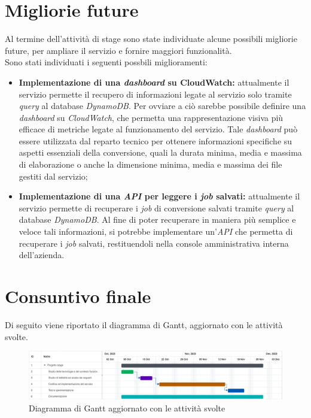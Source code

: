 \section{Migliorie future}
Al termine dell'attività di stage sono state individuate alcune possibili
migliorie future, per ampliare il servizio e fornire maggiori funzionalità. \\
Sono stati individuati i seguenti possbili miglioramenti:
\begin{itemize}
    \item \textbf{Implementazione di una \emph{dashboard} su CloudWatch:}
          attualmente il servizio permette il recupero di informazioni legate al
          servizio solo tramite \emph{query} al database \emph{DynamoDB}. Per ovviare
          a ciò sarebbe possibile definire una \emph{dashboard} su \emph{CloudWatch},
          che permetta una rappresentazione visiva più efficace di metriche legate al
          funzionamento del servizio. Tale \emph{dashboard} può essere utilizzata dal
          reparto tecnico per ottenere informazioni specifiche su aspetti essenziali
          della conversione, quali la durata minima, media e massima di elaborazione o
          anche la dimensione minima, media e massima dei file gestiti dal servizio;
    \item \textbf{Implementazione di una \emph{API} per leggere i \emph{job}
              salvati:} attualmente il servizio permette di recuperare i \emph{job} di
          conversione salvati tramite \emph{query} al database \emph{DynamoDB}. Al
          fine di poter recuperare in maniera più semplice e veloce tali informazioni,
          si potrebbe implementare un'\emph{API} che permetta di recuperare i
          \emph{job} salvati, restituendoli nella console amministrativa interna dell'azienda.
\end{itemize}

\section{Consuntivo finale}

Di seguito viene riportato il diagramma di Gantt, aggiornato con le attività
svolte.

\begin{figure}[H]
    \centering
    \includegraphics[width=\textwidth]{images/gantt.png}
    \caption{Diagramma di Gantt aggiornato con le attività svolte}
    \label{fig:gantt-finale}
\end{figure}

